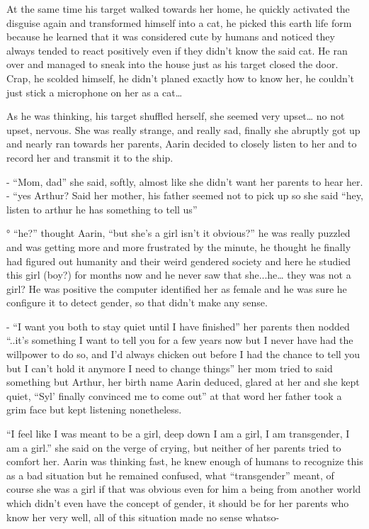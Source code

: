 \documentclass[hidelinks,12pt,a4paper]{book}
\begin{document}
At the same time his target walked towards her home, he quickly activated the disguise again and transformed 
himself into a cat, he picked this earth life form because he learned that it was considered cute by humans and 
noticed they always tended to react positively even if they didn't know the said cat. He ran over and managed to 
sneak into the house just as his target closed the door. Crap, he scolded himself, he didn't planed exactly how to 
know her, he couldn't just stick a microphone on her as a cat… \par
\bigskip

As he was thinking, his target shuffled herself, she seemed very upset… no not upset, nervous. 
She was really strange, and really sad, finally she abruptly got up and nearly ran towards her parents, 
Aarin decided to closely listen to her and to record her and transmit it to the ship.\par
\bigskip

- “Mom, dad” she said, softly, almost like she didn't want her parents to hear her.\newline
- “yes Arthur? Said her mother, his father seemed not to pick up so she said
 “hey, listen to arthur he has something to tell us”\newline

° “he?” thought Aarin, “but she's a girl isn't it obvious?” 
he was really puzzled and was getting more and more frustrated by the minute, 
he thought he finally had figured out humanity and their weird gendered society and 
here he studied this girl (boy?) for months now and he never saw that she...he… 
they was not a girl? He was positive the computer identified her as female and he was sure 
he configure it to detect gender, so that didn't make any sense.\par
\bigskip

- “I want you both to stay quiet until I have finished” her parents then nodded 
“..it's something I want to tell you for a few years now but I never have had the willpower to do so, 
and I'd always chicken out before I had the chance to tell you but I can't hold it anymore I need to change things” 
her mom tried to said something but Arthur, her birth name Aarin deduced, glared at her and she kept quiet, 
“Syl' finally convinced me to come out” at that word her father took a grim face but kept listening nonetheless.\newline

“I feel like I was meant to be a girl, deep down I am a girl, I am transgender, I am a girl.” she said on the verge of crying,
 but neither of her parents tried to comfort her. Aarin was thinking fast, 
 he knew enough of humans to recognize this as a bad situation but he remained confused, what
  “transgender” meant, of course she was a girl if that was obvious even for him a being from another world which 
  didn't even have the concept of gender, it should be for her parents who know her very well, all of this situation 
  made no sense whatso-\par
  \bigskip
\end{document}
